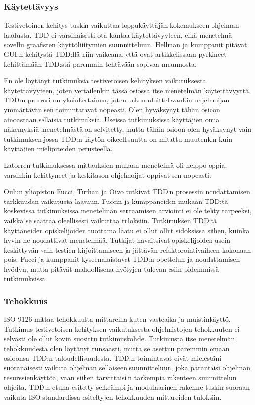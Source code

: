 \documentclass[finnish]{tktltiki2}
\theoremstyle{definition}
\theoremstyle{remark}
\begin{document}
\subsubsection{Käytettävyys}

Testivetoinen kehitys tuskin vaikuttaa loppukäyttäjän kokemukseen ohjelman laadusta. TDD ei varsinaisesti ota kantaa käytettävyyteen, eikä menetelmä sovellu graafisten käyttöliittymien suunnitteluun. Hellman ja kumppanit \cite{Hellman10} pitävät GUI:n kehitystä TDD:llä niin vaikeana, että ovat artikkelissaan pyrkineet kehittämään TDD:stä paremmin tehtävään sopivaa muunnosta.

En ole löytänyt tutkimuksia testivetoisen kehityksen vaikutuksesta käytettävyyteen, joten vertailenkin tässä osiossa itse menetelmän käytettävyyttä. TDD:n prosessi on yksinkertainen, joten uskon aloittelevankin ohjelmoijan ymmärtävän sen toimintatavat nopeasti. Olen hyväksynyt tähän osioon ainoastaan sellaisia tutkimuksia. Useissa tutkimuksissa käyttäjien omia näkemyksiä menetelmästä on selvitetty, mutta tähän osioon olen hyväksynyt vain tutkimuksen jossa TDD:n käytön oikeellisuutta on mitattu muutenkin kuin käyttäjien mielipiteiden perusteella.

Latorren \cite{Latorre14} tutkimuksessa mittauksien mukaan menetelmä oli helppo oppia, varsinkin kehittyneet ja keskitason ohjelmoijat oppivat sen nopeasti.

Oulun yliopiston Fucci, Turhan ja Oivo \cite{Fucci14} tutkivat TDD:n prosessin noudattamisen tarkkuuden vaikutusta laatuun. Fuccin ja kumppaneiden mukaan TDD:tä koskevissa tutkimuksissa menetelmän seuraamisen arviointi ei ole tehty tarpeeksi, vaikka se saattaa oleellisesti vaikuttaa tuloksiin. Tutkimuksen TDD:tä käyttäneiden opiskelijoiden tuottama laatu ei ollut ollut sidoksissa siihen, kuinka hyvin he noudattivat menetelmää. Tutkijat havaitsivat opiskelijoiden usein keskittyvän vain testien kirjoittamiseen ja jättävän refaktorointivaiheen kokonaan pois. Fucci ja kumppanit kyseenalaistavat TDD:n opettelun ja noudattamisen hyödyn, mutta pitävät mahdollisena hyötyjen tulevan esiin pidemmissä tutkimuksissa.

\subsubsection{Tehokkuus}

ISO 9126 mittaa tehokkuutta mittareilla kuten vasteaika ja muistinkäyttö. Tutkimus testivetoisen kehityksen vaikutuksesta ohjelmistojen tehokkuuten ei selvästi ole ollut kovin suosittu tutkimuskohde. Tutkimusta itse menetelmän tehokkuudesta olen löytänyt runsaasti, mutta se asettuu paremmin omaan osioonsa TDD:n taloudellisuudesta. TDD:n toimintavat eivät mielestäni suoranaisesti vaikuta ohjelman sellaiseen suunnitteluun, joka parantaisi ohjelman resurssienkäyttöä, vaan siihen tarvittaisiin tarkempia rakenteen suunnittelun ohjeita. TDD:n etuna esitetty selkeämpi ja modulaarinen rakenne tuskin suoraan vaikuta ISO-standardissa esiteltyjen tehokkuuden mittareiden tuloksiin.
\end{document}
